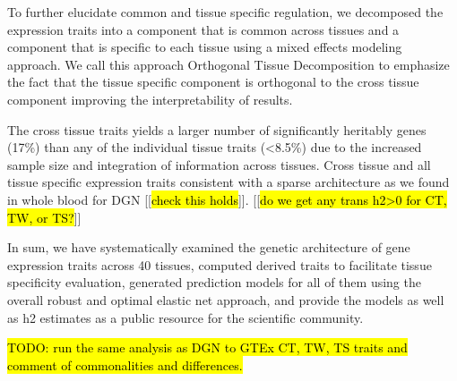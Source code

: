 \documentclass[]{article}
\begin{document}
To further elucidate common and tissue specific regulation, we decomposed the expression traits into a component that is common across tissues and a component that is specific to each tissue using a mixed effects modeling approach. We call this approach Orthogonal Tissue Decomposition to emphasize the fact that the tissue specific component is orthogonal to the cross tissue component improving the interpretability of results.

The cross tissue traits yields a larger number of significantly heritably genes (17\%) than any of the individual tissue traits (<8.5\%) due to the increased sample size and integration of information across tissues. Cross tissue and all tissue specific expression traits consistent with a sparse architecture as we found in whole blood for DGN [[\hl{check this holds}]]. [[\hl{do we get any trans h2>0 for CT, TW, or TS?}]]

In sum, we have systematically examined the genetic architecture of gene expression traits across 40 tissues, computed derived traits to facilitate tissue specificity evaluation, generated prediction models for all of them using the overall robust and optimal elastic net approach, and provide the models as well as h2 estimates as a public resource for the scientific community.

\hl{TODO: run the same analysis as DGN to GTEx CT, TW, TS traits and comment of commonalities and differences.}




\end{document}
